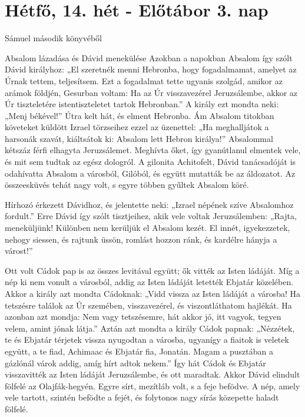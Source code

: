 \documentclass[twoside]{article}
\begin{document}


\section*{Hétfő, 14. hét - Előtábor 3. nap}

Sámuel második könyvéből

\begin{lectio}{Absalom lázadása és Dávid menekülése}
\noindent Azokban a napokban Absalom így szólt Dávid királyhoz: „El szeretnék menni Hebronba, hogy fogadalmamat, amelyet az Úrnak tettem, teljesítsem. Ezt a fogadalmat tette ugyanis szolgád, amikor az arámok földjén, Gesurban voltam: Ha az Úr visszavezérel Jeruzsálembe, akkor az Úr tiszteletére istentiszteletet tartok Hebronban.” A király ezt mondta neki: „Menj békével!” Útra kelt hát, és elment Hebronba. Ám Absalom titokban követeket küldött Izrael törzseihez ezzel az üzenettel: „Ha meghalljátok a harsonák szavát, kiáltsátok ki: Absalom lett Hebron királya!” Absalommal kétszáz férfi elhagyta Jeruzsálemet. Meghívta őket, így gyanútlanul elmentek vele, és mit sem tudtak az egész dologról. A gilonita Achitofelt, Dávid tanácsadóját is odahívatta Absalom a városból, Gilóból, és együtt mutatták be az áldozatot. Az összeesküvés tehát nagy volt, s egyre többen gyűltek Absalom köré.

Hírhozó érkezett Dávidhoz, és jelentette neki: „Izrael népének szíve Absalomhoz fordult.” Erre Dávid így szólt tisztjeihez, akik vele voltak Jeruzsálemben: „Rajta, meneküljünk! Különben nem kerüljük el Absalom kezét. El innét, igyekezzetek, nehogy siessen, és rajtunk üssön, romlást hozzon ránk, és kardélre hányja a várost!”

Ott volt Cádok pap is az összes levitával együtt; ők vitték az Isten ládáját. Míg a nép ki nem vonult a városból, addig az Isten ládáját letették Ebjatár közelében. Akkor a király azt mondta Cádoknak: „Vidd vissza az Isten ládáját a városba! Ha tetszésre találok az Úr szemében, visszavezérel, és viszontláthatom hajlékát. Ha azonban azt mondja: Nem vagy tetszésemre, hát akkor jó, itt vagyok, tegyen velem, amint jónak látja.” Aztán azt mondta a király Cádok papnak: „Nézzétek, te és Ebjatár térjetek vissza nyugodtan a városba, ugyanígy a fiaitok is veletek együtt, a te fiad, Achimaac és Ebjatár fia, Jonatán. Magam a pusztában a gázlónál várok addig, amíg hírt adtok nekem.” Így hát Cádok és Ebjatár visszavitték az Isten ládáját Jeruzsálembe, és ott maradtak. Akkor Dávid elindult fölfelé az Olajfák-hegyén. Egyre sírt, mezítláb volt, s a feje befödve. A nép, amely vele tartott, szintén befödte a fejét, és folytonos nagy sírás közepette haladt fölfelé.


\end{lectio}
\end{document}
